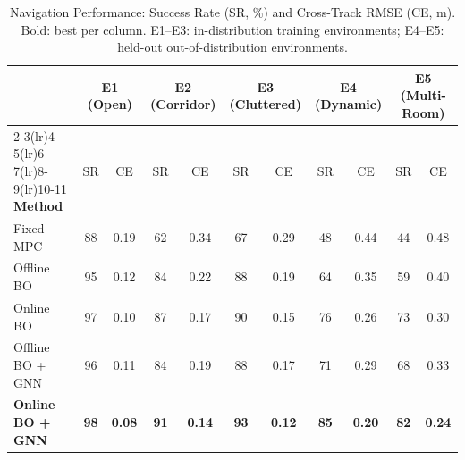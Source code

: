 \documentclass[conference]{IEEEtran}
\begin{document}
\begin{table}[t]
	\centering
	\caption{Navigation Performance: Success Rate (SR, \%) and Cross-Track RMSE (CE, m). Bold: best per column. E1--E3: in-distribution training environments; E4--E5: held-out out-of-distribution environments.}
	\label{tab:main}
	\renewcommand{\arraystretch}{1.15}
	\begin{tabular}{lcccccccccc}
		\toprule
		                         & \multicolumn{2}{c}{\textbf{E1 (Open)}} & \multicolumn{2}{c}{\textbf{E2 (Corridor)}} & \multicolumn{2}{c}{\textbf{E3 (Cluttered)}} & \multicolumn{2}{c}{\textbf{E4 (Dynamic)}} & \multicolumn{2}{c}{\textbf{E5 (Multi-Room)}}                                                                             \\
		\cmidrule(lr){2-3}\cmidrule(lr){4-5}\cmidrule(lr){6-7}\cmidrule(lr){8-9}\cmidrule(lr){10-11}
		\textbf{Method}          & SR                                     & CE                                         & SR                                          & CE                                        & SR                                           & CE            & SR          & CE            & SR          & CE            \\
		\midrule
		Fixed MPC                & 88                                     & 0.19                                       & 62                                          & 0.34                                      & 67                                           & 0.29          & 48          & 0.44          & 44          & 0.48          \\
		Offline BO               & 95                                     & 0.12                                       & 84                                          & 0.22                                      & 88                                           & 0.19          & 64          & 0.35          & 59          & 0.40          \\
		Online BO                & 97                                     & 0.10                                       & 87                                          & 0.17                                      & 90                                           & 0.15          & 76          & 0.26          & 73          & 0.30          \\
		Offline BO + GNN         & 96                                     & 0.11                                       & 84                                          & 0.19                                      & 88                                           & 0.17          & 71          & 0.29          & 68          & 0.33          \\
		\textbf{Online BO + GNN} & \textbf{98}                            & \textbf{0.08}                              & \textbf{91}                                 & \textbf{0.14}                             & \textbf{93}                                  & \textbf{0.12} & \textbf{85} & \textbf{0.20} & \textbf{82} & \textbf{0.24} \\
		\bottomrule
	\end{tabular}
\end{table}
\end{document}
